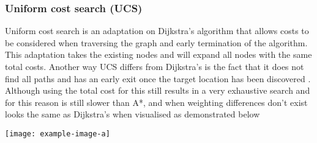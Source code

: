 \subsubsection{Uniform cost search (UCS)}
Uniform cost search is an adaptation on Dijkstra’s algorithm that allows costs to be considered when traversing the graph and early termination of the algorithm. This adaptation takes the existing nodes and will expand all nodes with the same total costs. Another way UCS differs from Dijkstra’s is the fact that it does not find all paths and has an early exit once the target location has been discovered \citetemp.  Although using the total cost for this still results in a very exhaustive search and for this reason is still slower than A*, and when weighting differences don’t exist looks the same as Dijkstra’s when visualised as demonstrated below
\begin{center}
\texttt{[image: example-image-a]}
\end{center}
